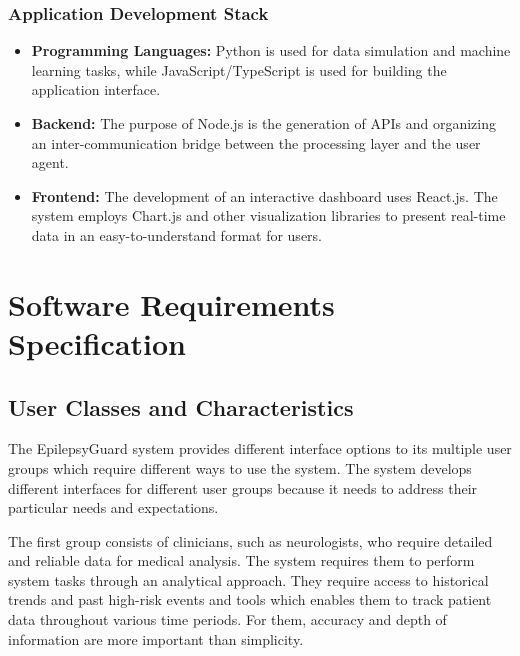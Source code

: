\documentclass[12pt, a4paper, oneside]{report}
\newcommand{\chapterpage}[2]{%
    \cleardoublepage
    \thispagestyle{empty}
    \vspace*{\fill}
    \begin{center}
        \huge \textbf{Chapter #1} \\
        \vspace{1cm}
        \Huge #2
    \end{center}
    \vspace*{\fill}
    \newpage
}
\begin{document}
\subsection{Application Development Stack}

\begin{itemize}
    \item \textbf{Programming Languages:}  
    Python is used for data simulation and machine learning tasks, while JavaScript/TypeScript is used for building the application interface.

    \item \textbf{Backend:}  
    The purpose of Node.js is the generation of APIs and organizing an inter-communication bridge between the processing layer and the user agent.

    \item \textbf{Frontend:}  
    The development of an interactive dashboard uses React.js. The system employs Chart.js and other visualization libraries to present real-time data in an easy-to-understand format for users.
\end{itemize}


\chapter{Software Requirements Specification}

\section{User Classes and Characteristics}

The EpilepsyGuard system provides different interface options to its multiple user groups which require different ways to use the system. The system develops different interfaces for different user groups because it needs to address their particular needs and expectations.

The first group consists of clinicians, such as neurologists, who require detailed and reliable data for medical analysis. The system requires them to perform system tasks through an analytical approach. They require access to historical trends and past high-risk events and tools which enables them to track patient data throughout various time periods. For them, accuracy and depth of information are more important than simplicity.
\end{document}
